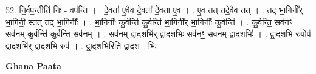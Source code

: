 \documentclass[17pt]{extarticle}
\begin{document}
52. नि॒र्वप॒न्तीति॑ निः - वप॑न्ति । . दे॒वता॑ ए॒वैव दे॒वता॑ दे॒वता॑ ए॒व । . ए॒व तत् तदे॒वैव तत् । . तद् भा॒गिनी᳚र् भा॒गिनी॒ स्तत् तद् भा॒गिनीः᳚ । . भा॒गिनीः᳚ कु॒र्वन्ति॑ कु॒र्वन्ति॑ भा॒गिनी᳚र् भा॒गिनीः᳚ कु॒र्वन्ति॑ । . कु॒र्वन्ति॒ सव॑नꣳ॒॒ सव॑नम् कु॒र्वन्ति॑ कु॒र्वन्ति॒ सव॑नम् । . सव॑नम् द्वाद॒शभि॑र् द्वाद॒शभिः॒ सव॑नꣳ॒॒ सव॑नम् द्वाद॒शभिः॑ । . द्वा॒द॒शभि॒ रुपोप॑ द्वाद॒शभि॑र् द्वाद॒शभि॒ रुप॑ । . द्वा॒द॒शभि॒रिति॑ द्वाद॒श - भिः॒ । \newline

\textbf{Ghana Paata } \newline
\end{document}
